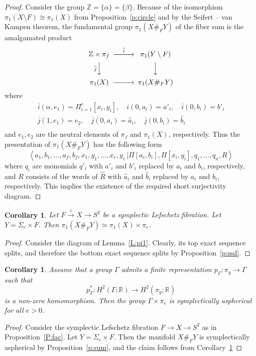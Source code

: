\documentclass[12pt]{amsart}
\newcommand{\B}[1]{{\mathbb #1}}
\newcommand{\Z}{\B Z}
\newcommand{\R}{\B R}
\newtheorem{cory}[subsection]{Corollary}
\theoremstyle{definition}
\theoremstyle{remark}
\numberwithin{figure}{section}
\numberwithin{table}{section}
\numberwithin{equation}{section}
\newcommand{\Ga}{{\Gamma}}
\newcommand{\la}{{\lambda}}
\newcommand{\Si}{{\Sigma}}
\def\la{\langle}
\def\ra{\rangle}
\def\pg{p_{\Ga}}
\def\wh{\widehat}
\def\ov{\overline}
\newcommand{\map}[1]{\stackrel {#1}\longrightarrow}
\newcommand\lemref{Lemma~\ref}
\newcommand\propref{Proposition~\ref}
\newcommand\corref{Corollary~\ref}
\newcommand\coryref{\corref}
\begin{document}
\begin{proof}
Consider the group $\Z=\{\alpha\}=\{\beta\}$.
Because of the isomorphism $\pi_1(X \setminus F) \cong \pi_1(X) $ from \propref{p:circle} and by the Seifert -- van Kampen theorem, the fundamental group $\pi_1(X \#_F Y)$
of the fiber sum is the amalgamated product 
$$ 
\CD 
\B Z\times \pi_f @>\ov i>> \pi_1(Y\setminus F)\\
@V\ov jVV @VVV\\
\pi_1(X) @>>> \pi_1(X \#_F Y)
\endCD
$$ 
where
%
\begin{eqnarray*} 
\ov i(\alpha,e_1)= \Pi_{i=1}^{e}[x_i,y_i],  
\quad i(0,a_i) = a'_i, \quad \ov i(0,b_i)=b'_i\\  
\ov j(1,e_1)= e_2, \quad \ov j(0, a_i) = \wh a_i,  
\quad \ov j(0,b_i)=\wh b_i\\  
\end{eqnarray*}
% 
and $e_1, e_2$ are the neutral elements of $\pi_f$ and $\pi_1(X)$, respectively. 
Thus the presentation of $\pi_1(X\#_F Y)$ has the following 
form 
$$ 
\left\la a_1,b_1,\dots,a_f,b_f,x_1,y_1,\dots,x_e,y_e \,\bigg\vert
\Pi[a_i,b_i],\Pi[x_i,y_i], 
q_1,\dots, q_n, R 
\right\ra 
$$ 
where $q_i$ are monomials $q'_i$ with $a'_i$ and $b'_i$  
replaced by $a_i$ and $b_i$, respectively, and $R$ consists of the words of $\wh R$ with $\wh a_i$ and $\wh b_i$ replaced by $a_i$ and $b_i$, respectively. 
This implies the existence of the  required short surjectivity diagram. 
\end{proof} 

\begin{cory}\label{c:prod}
Let $F\map{i} X \to S^2$ be a symplectic Lefschetz fibration. Let $Y=\Si_e\times 
F$. Then $\pi_1 (X\#_FY)\simeq \pi_1(X)\times \pi_e$.
\end{cory}

\begin{proof}
Consider the diagram of \lemref{L:pi1}. Clearly, its top exact sequence splits, and therefore the bottom exact sequence splits by \propref{p:ssd}.
\end{proof}

\begin{cory}\label{c:split}
Assume that a group $\Ga$ admits a finite representation $p_{\Ga}: \pi_g\to \Ga 
$ such that 
$$
\pg^*: H^2(\Ga;\R)\to H^2(\pi_g;\R)
$$ is a non-zero homomorphism. Then the group $\Ga \times \pi_e$ is 
symplectically aspherical for all $e>0$.
\end{cory} 


\begin{proof} Consider the symplectic Lefschetz fibration $F\to X \to S^2$ as in 
\propref{P:fac}. Let $Y=\Si_e\times F$. Then the manifold $X\#_FY$ is symplectically aspherical by \propref{p:sum}, and the claim follows from \coryref{c:prod}
\end{proof}
\end{document}

